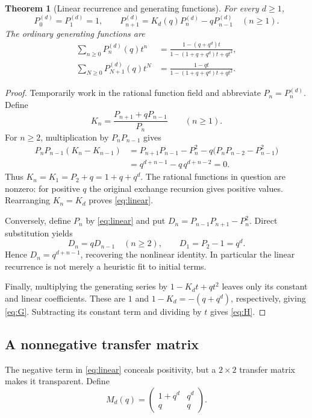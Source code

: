 \documentclass[11pt,letterpaper]{article}
\numberwithin{equation}{section}
\newtheorem{theorem}{Theorem}[section]
\theoremstyle{definition}
\begin{document}
\begin{theorem}[Linear recurrence and generating functions]\label{thm:linear}
For every $d\geq1$,
\begin{equation}\label{eq:linear}
 P_0^{(d)}=P_1^{(d)}=1,\qquad
 P_{n+1}^{(d)}=K_d(q)P_n^{(d)}-qP_{n-1}^{(d)}\quad(n\geq1).
\end{equation}
The ordinary generating functions are
\begin{align}
 \sum_{n\geq0}P_n^{(d)}(q)t^n
   &=\frac{1-(q+q^d)t}{1-(1+q+q^d)t+qt^2},\label{eq:G}\\
 \sum_{N\geq0}P_{N+1}^{(d)}(q)t^N
   &=\frac{1-qt}{1-(1+q+q^d)t+qt^2}.\label{eq:H}
\end{align}
\end{theorem}
\begin{proof}
Temporarily work in the rational function field and abbreviate
$P_n=P_n^{(d)}$. Define
\[
 K_n=\frac{P_{n+1}+qP_{n-1}}{P_n}\qquad(n\geq1).
\]
For $n\geq2$, multiplication by $P_nP_{n-1}$ gives
\begin{align*}
 P_nP_{n-1}(K_n-K_{n-1})
 &=P_{n+1}P_{n-1}-P_n^2
    -q\bigl(P_nP_{n-2}-P_{n-1}^2\bigr)\\
 &=q^{d+n-1}-q\,q^{d+n-2}=0.
\end{align*}
Thus $K_n=K_1=P_2+q=1+q+q^d$. The rational functions in question are nonzero:
for positive $q$ the original exchange recursion gives positive values.
Rearranging $K_n=K_d$ proves \eqref{eq:linear}.

Conversely, define $P_n$ by \eqref{eq:linear} and put
$D_n=P_{n-1}P_{n+1}-P_n^2$. Direct substitution yields
\[
 D_n=qD_{n-1}\quad(n\geq2),\qquad D_1=P_2-1=q^d.
\]
Hence $D_n=q^{d+n-1}$, recovering the nonlinear identity. In particular the
linear recurrence is not merely a heuristic fit to initial terms.

Finally, multiplying the generating series by $1-K_dt+qt^2$ leaves only its
constant and linear coefficients. These are $1$ and $1-K_d=-(q+q^d)$,
respectively, giving \eqref{eq:G}. Subtracting its constant term and dividing
by $t$ gives \eqref{eq:H}.
\end{proof}

\subsection{A nonnegative transfer matrix}

The negative term in \eqref{eq:linear} conceals positivity, but a $2\times2$
transfer matrix makes it transparent. Define
\begin{equation}\label{eq:transfer}
 M_d(q)=\begin{pmatrix}1+q^d&q^d\\q&q\end{pmatrix}.
\end{equation}
\end{document}
